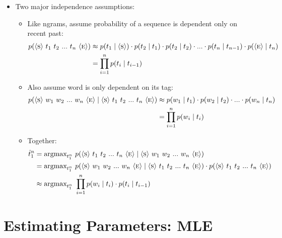 \documentclass[11pt,letterpaper]{article}
\newcommand{\ngramstart}{\ensuremath{\langle \textsc{s} \rangle}}
\newcommand{\ngramend}{\ensuremath{\langle \textsc{e} \rangle}}
\begin{document}
\begin{itemize}
  \item Two major independence assumptions:
    \begin{itemize}
      \item Like ngrams, assume probability of a sequence is dependent only on recent past:
        \begin{align*}
          p(\ngramstart~t_1~t_2~...~t_n~\ngramend) 
                    &\approx p(t_1 \mid \ngramstart) \cdot 
                              p(t_2 \mid t_1) \cdot 
                              p(t_2 \mid t_2) \cdot 
                              ...  \cdot 
                              p(t_n \mid t_{n-1}) \cdot 
                              p(\ngramend \mid t_n) \\
                    &= \prod_{i=1}^n p(t_i \mid t_{i-1})
        \end{align*}
      \item Also assume word is only dependent on its tag: \vspace{2mm}
        \begin{align*}
          p(\ngramstart~w_1~w_2~...~w_n~\ngramend \mid \ngramstart~t_1~t_2~...~t_n~\ngramend) 
                    &\approx p(w_1 \mid t_1) \cdot 
                             p(w_2 \mid t_2) \cdot 
                             ...  \cdot 
                             p(w_n \mid t_n) \\
                    &= \prod_{i=1}^n p(w_i \mid t_i)
        \end{align*}
      \item Together: 
        \begin{align*}
        \hat{t}_1^n &= \text{argmax}_{t_1^n}~p(\ngramstart~t_1~t_2~...~t_n~\ngramend \mid \ngramstart~w_1~w_2~...~w_n~\ngramend) \\
                    &= \text{argmax}_{t_1^n}~p(\ngramstart~w_1~w_2~...~w_n~\ngramend \mid \ngramstart~t_1~t_2~...~t_n~\ngramend) \cdot p(\ngramstart~t_1~t_2~...~t_n~\ngramend) \\
                    &\approx \text{argmax}_{t_1^n}~\prod_{i=1}^n p(w_i \mid t_i) \cdot p(t_i \mid t_{i-1})
        \end{align*}
    \end{itemize}
\end{itemize}


\section{Estimating Parameters: MLE}
\end{document}
